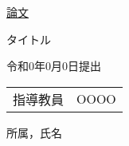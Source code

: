 \documentclass[a4paper,10pt, uplatex]{jsreport}
\numberwithin{equation}{section}
\begin{document}
\begin{titlepage}
  \begin{center}
    \vspace*{2cm}

    \Huge{\underline{論文}}
    \vspace*{2cm}

    \huge{タイトル}
    \vspace*{2cm}

    \LARGE{令和0年0月0日提出}
    \vspace*{2cm}

    \LARGE{
      \begin{tabular}{ll}
        指導教員&OOOO
      \end{tabular}
    }
    \vspace*{2cm}

    \LARGE{所属，氏名}
  \end{center}
\end{titlepage}

\newpage
\setcounter{page}{0}
\thispagestyle{empty}
\setcounter{tocdepth}{1}
\tableofcontents




\end{document}
